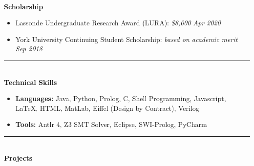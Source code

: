 \documentclass[a4paper,10pt,titlepage]{article}
\begin{document}
\leftline{\rule{\linewidth}{0.1mm}}
~\\
\textbf {\Large Scholarship}
\begin{itemize}%
	\item Lassonde Undergraduate Research Award (LURA): \emph {\$8,000} {\hfill \emph {Apr 2020}}
	\item York University Continuing Student Scholarship: \emph {based on academic merit} {\hfill \emph {Sep 2018}}
\end{itemize}
\rule{\linewidth}{0.1mm}
~\\
\textbf {\Large Technical Skills} 
\begin{itemize}%
	\item {\bf Languages:} Java, Python, Prolog, C, Shell Programming, Javascript, \LaTeX, HTML, MatLab, Eiffel (Design by Contract),  Verilog
	\item {\bf Tools:} Antlr 4, Z3 SMT Solver, Eclipse, SWI-Prolog, PyCharm
\end{itemize}
\rule{\linewidth}{0.1mm}
~\\
\textbf {\Large Projects}
\end{document}
